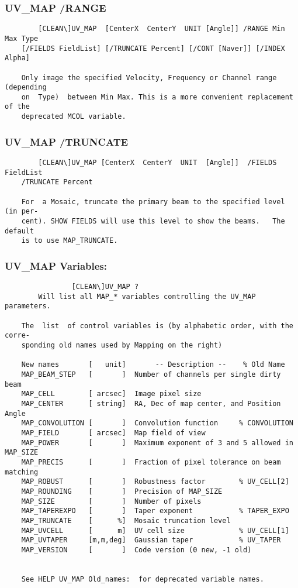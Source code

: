 \subsubsection{UV\_MAP /RANGE}
\begin{verbatim}
        [CLEAN\]UV_MAP  [CenterX  CenterY  UNIT [Angle]] /RANGE Min Max Type
    [/FIELDS FieldList] [/TRUNCATE Percent] [/CONT [Naver]] [/INDEX Alpha]

    Only image the specified Velocity, Frequency or Channel range (depending
    on  Type)  between Min Max. This is a more convenient replacement of the
    deprecated MCOL variable.

\end{verbatim}
\subsubsection{UV\_MAP /TRUNCATE}
\begin{verbatim}
        [CLEAN\]UV_MAP [CenterX  CenterY  UNIT  [Angle]]  /FIELDS  FieldList
    /TRUNCATE Percent

    For  a Mosaic, truncate the primary beam to the specified level (in per-
    cent). SHOW FIELDS will use this level to show the beams.   The  default
    is to use MAP_TRUNCATE.

\end{verbatim}
\subsubsection{UV\_MAP Variables:}
\begin{verbatim}
                [CLEAN\]UV_MAP ?
        Will list all MAP_* variables controlling the UV_MAP parameters.

    The  list  of control variables is (by alphabetic order, with the corre-
    sponding old names used by Mapping on the right)

    New names       [   unit]       -- Description --    % Old Name
    MAP_BEAM_STEP   [       ]  Number of channels per single dirty beam
    MAP_CELL        [ arcsec]  Image pixel size
    MAP_CENTER      [ string]  RA, Dec of map center, and Position Angle
    MAP_CONVOLUTION [       ]  Convolution function     % CONVOLUTION
    MAP_FIELD       [ arcsec]  Map field of view
    MAP_POWER       [       ]  Maximum exponent of 3 and 5 allowed in MAP_SIZE
    MAP_PRECIS      [       ]  Fraction of pixel tolerance on beam matching
    MAP_ROBUST      [       ]  Robustness factor        % UV_CELL[2]
    MAP_ROUNDING    [       ]  Precision of MAP_SIZE
    MAP_SIZE        [       ]  Number of pixels
    MAP_TAPEREXPO   [       ]  Taper exponent           % TAPER_EXPO
    MAP_TRUNCATE    [      %]  Mosaic truncation level
    MAP_UVCELL      [      m]  UV cell size             % UV_CELL[1]
    MAP_UVTAPER     [m,m,deg]  Gaussian taper           % UV_TAPER
    MAP_VERSION     [       ]  Code version (0 new, -1 old)


    See HELP UV_MAP Old_names:  for deprecated variable names.

\end{verbatim}
